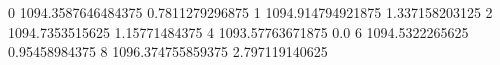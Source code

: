 0 1094.3587646484375 0.7811279296875
1 1094.914794921875 1.337158203125
2 1094.7353515625 1.15771484375
4 1093.57763671875 0.0
6 1094.5322265625 0.95458984375
8 1096.374755859375 2.797119140625
